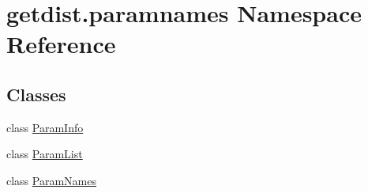 \hypertarget{namespacegetdist_1_1paramnames}{}\section{getdist.\+paramnames Namespace Reference}
\label{namespacegetdist_1_1paramnames}
\subsection*{Classes}
\begin{DoxyCompactItemize}
\item 
class \mbox{\hyperlink{classgetdist_1_1paramnames_1_1ParamInfo}{Param\+Info}}
\item 
class \mbox{\hyperlink{classgetdist_1_1paramnames_1_1ParamList}{Param\+List}}
\item 
class \mbox{\hyperlink{classgetdist_1_1paramnames_1_1ParamNames}{Param\+Names}}
\end{DoxyCompactItemize}
